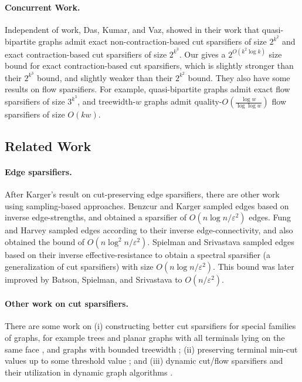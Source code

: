 \documentclass[11pt]{article}
\theoremstyle{definition}
\newcommand{\eps}{{\varepsilon}}
\begin{document}
 

\paragraph{Concurrent Work.} Independent of work, Das, Kumar, and Vaz, showed in their work \cite{das2024nearly} that quasi-bipartite graphs admit exact non-contraction-based cut sparsifiers of size $2^{k^2}$ and exact contraction-based cut sparsifiers of size $2^{k^3}$. Our  gives a $2^{O(k^2\log k)}$ size bound for exact contraction-based cut sparsifiers, which is slightly stronger than their $2^{k^3}$ bound, and slightly weaker than their $2^{k^2}$ bound. They also have some results on flow sparsifiers. For example, quasi-bipartite graphs admit exact flow sparsifiers of size $3^{k^3}$, and treewidth-$w$ graphs admit quality-$O(\frac{\log w}{\log\log w})$ flow sparsifiers of size $O(kw)$.




\subsection{Related Work}
\label{sec: related}

\paragraph{Edge sparsifiers.} 
After Karger's result \cite{karger1999random} on cut-preserving edge sparsifiers, there are other work using sampling-based approaches. Benzcur and Karger \cite{benczur1996approximate} sampled edges based on inverse edge-strengths, and obtained a sparsifier of $O(n\log n/\eps^2)$ edges. Fung and Harvey \cite{fung2010graph} sampled edges according to their inverse edge-connectivity, and also obtained the bound of $O(n\log^2 n/\eps^2)$. Spielman and Srivastava \cite{spielman2011graph} sampled edges based on their inverse effective-resistance to obtain a spectral sparsifier (a generalization of cut sparsifiers) with size $O(n\log n/\eps^2)$. This bound was later improved by Batson, Spielman, and Srivastava \cite{batson2012twice} to $O(n/\eps^2)$.

\paragraph{Other work on cut sparsifiers.}
There are some work on (i) constructing better cut sparsifiers for  special families of graphs, for example trees \cite{goranci2017vertex} and planar graphs with all terminals lying on the same face \cite{goranci2017improved}, and graphs with bounded treewidth \cite{andoni2014towards}; (ii) preserving terminal min-cut values up to some threshold value \cite{chalermsook2021vertex,liu2020vertex}; and
(iii) dynamic cut/flow sparsifiers and their utilization in dynamic graph algorithms \cite{durfee2019fully,chen2020fast,goranci2021expander}.
\end{document}
